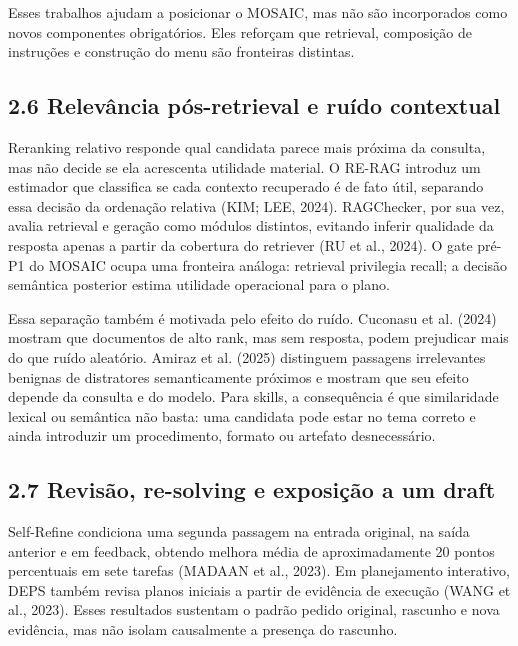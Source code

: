 \documentclass[12pt,a4paper]{article}
\begin{document}
Esses trabalhos ajudam a posicionar o MOSAIC, mas não são incorporados como novos componentes obrigatórios. Eles reforçam que retrieval, composição de instruções e construção do menu são fronteiras distintas.


\subsection*{2.6 Relevância pós-retrieval e ruído contextual}

Reranking relativo responde qual candidata parece mais próxima da consulta, mas não decide se ela acrescenta utilidade material. O RE-RAG introduz um estimador que classifica se cada contexto recuperado é de fato útil, separando essa decisão da ordenação relativa (KIM; LEE, 2024). RAGChecker, por sua vez, avalia retrieval e geração como módulos distintos, evitando inferir qualidade da resposta apenas a partir da cobertura do retriever (RU et al., 2024). O gate pré-P1 do MOSAIC ocupa uma fronteira análoga: retrieval privilegia recall; a decisão semântica posterior estima utilidade operacional para o plano.

Essa separação também é motivada pelo efeito do ruído. Cuconasu et al. (2024) mostram que documentos de alto rank, mas sem resposta, podem prejudicar mais do que ruído aleatório. Amiraz et al. (2025) distinguem passagens irrelevantes benignas de distratores semanticamente próximos e mostram que seu efeito depende da consulta e do modelo. Para skills, a consequência é que similaridade lexical ou semântica não basta: uma candidata pode estar no tema correto e ainda introduzir um procedimento, formato ou artefato desnecessário.


\subsection*{2.7 Revisão, re-solving e exposição a um draft}

Self-Refine condiciona uma segunda passagem na entrada original, na saída anterior e em feedback, obtendo melhora média de aproximadamente 20 pontos percentuais em sete tarefas (MADAAN et al., 2023). Em planejamento interativo, DEPS também revisa planos iniciais a partir de evidência de execução (WANG et al., 2023). Esses resultados sustentam o padrão pedido original, rascunho e nova evidência, mas não isolam causalmente a presença do rascunho.
\end{document}
